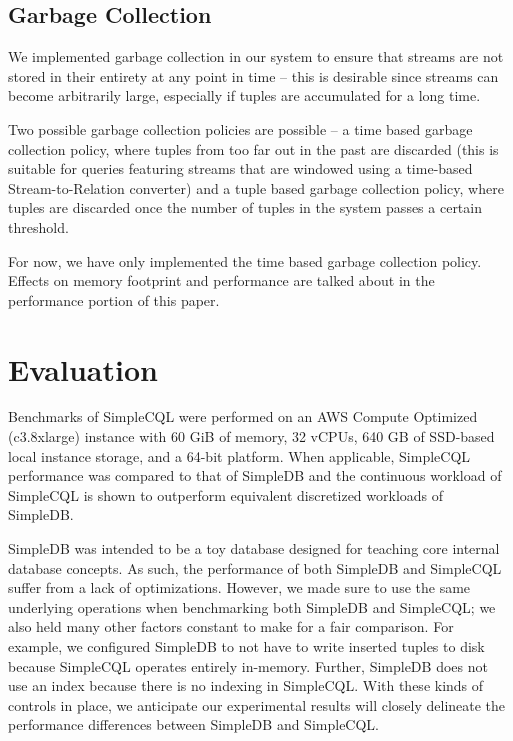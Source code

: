 \documentclass[a4paper, 10pt, conference]{IEEEconf}
\begin{document}
\subsection{Garbage Collection}

We implemented garbage collection in our system to ensure that streams are not stored in their entirety at any point in time -- this is desirable since streams can become arbitrarily large, especially if tuples are accumulated for a long time.

Two possible garbage collection policies are possible -- a time based garbage collection policy, where tuples from too far out in the past are discarded (this is suitable for queries featuring streams that are windowed using a time-based Stream-to-Relation converter) and a tuple based garbage collection policy, where tuples are discarded once the number of tuples in the system passes a certain threshold.

For now, we have only implemented the time based garbage collection policy. Effects on memory footprint and performance are talked about in the performance portion of this paper.


\section{Evaluation}
Benchmarks of SimpleCQL were performed on an AWS Compute Optimized (c3.8xlarge) instance with 60 GiB of memory, 32 vCPUs, 640 GB of SSD-based local instance storage, and a 64-bit platform.  When applicable, SimpleCQL performance was compared to that of SimpleDB and the continuous workload of SimpleCQL is shown to outperform equivalent discretized workloads of SimpleDB.  

SimpleDB was intended to be a toy database designed for teaching core internal database concepts.  As such, the performance of both SimpleDB and SimpleCQL suffer from a lack of optimizations.  However, we made sure to use the same underlying operations when benchmarking both SimpleDB and SimpleCQL; we also held many other factors constant to make for a fair comparison. For example, we configured SimpleDB to not have to write inserted tuples to disk because SimpleCQL operates entirely in-memory. Further, SimpleDB does not use an index because there is no indexing in SimpleCQL. With these kinds of controls in place, we anticipate our experimental results will closely delineate the performance differences between SimpleDB and SimpleCQL.
\end{document}
